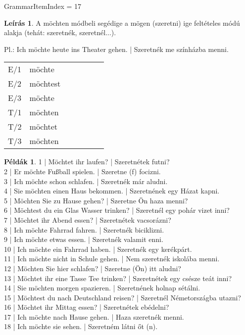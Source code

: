 \documentclass{article}
\theoremstyle{definition}
\newtheorem*{exmp}{Példák}
\newtheorem*{desc}{Leírás}
\begin{document}
GrammarItemIndex = 17

\begin{desc}
A möchten módbeli segédige a mögen (szeretni) ige feltételes módú
alakja (tehát: szeretnék, szeretnél...).

Pl.: Ich möchte heute ins Theater gehen. | Szeretnék me színházba menni.

\begin{tabular}{lllllll}
E/1 & möchte \\
E/2 & möchtest \\
E/3 & möchte \\
T/1 & möchten \\
T/2 & möchtet \\
T/3 & möchten \\
\end{tabular}
\end{desc}

\begin{exmp}
1 | Möchtet ihr laufen? | Szeretnétek futni?\\
2 | Er möchte Fußball spielen. | Szeretne (f) focizni.\\
3 | Ich möchte schon schlafen. | Szeretnék már aludni.\\
4 | Sie möchten einen Haus bekommen. | Szeretnének egy Házat kapni.\\
5 | Möchten Sie zu Hause gehen? | Szeretne Ön haza menni?\\
6 | Möchtest du ein Glas Wasser trinken? | Szeretnél egy pohár vizet inni?\\
7 | Möchtet ihr Abend essen? | Szeretnétek vacsorázni?\\
8 | Ich möchte Fahrrad fahren. | Szeretnék biciklizni.\\
9 | Ich möchte etwas essen. | Szeretnék valamit enni.\\
10 | Ich möchte ein Fahrrad haben. | Szeretnék egy kerékpárt.\\
11 | Ich möchte nicht in Schule gehen. | Nem szeretnék iskolába menni.\\
12 | Möchten Sie hier schlafen? | Szeretne (Ön) itt aludni?\\
13 | Möchtet ihr eine Tasse Tee trinken? | Szeretnétek egy csésze teát inni?\\
14 | Sie möchten morgen spazieren. | Szeretnének holnap sétálni.\\
15 | Möchtest du nach Deutschland reisen? | Szeretnél Németországba utazni?\\
16 | Möchtet ihr Mittag essen? | Szeretnétek ebédelni?\\
17 | Ich möchte nach Hause gehen. | Haza szeretnék menni.\\
18 | Ich möchte sie sehen. | Szeretném látni őt (n).\\
\end{exmp}
\end{document}
